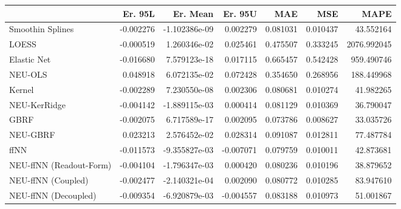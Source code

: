 \begin{tabular}{lrrrrrr}
\toprule
{} &   Er. 95L &      Er. Mean &   Er. 95U &       MAE &       MSE &         MAPE \\
\midrule
Smoothin Splines        & -0.002276 & -1.102386e-09 &  0.002279 &  0.081031 &  0.010437 &    43.552164 \\
LOESS                   & -0.000519 &  1.260346e-02 &  0.025461 &  0.475507 &  0.333245 &  2076.992045 \\
Elastic Net             & -0.016680 &  7.579123e-18 &  0.017115 &  0.665457 &  0.542428 &   959.490746 \\
NEU-OLS                 &  0.048918 &  6.072135e-02 &  0.072428 &  0.354650 &  0.268956 &   188.449968 \\
Kernel                  & -0.002289 &  7.230550e-08 &  0.002306 &  0.080681 &  0.010274 &    41.982265 \\
NEU-KerRidge            & -0.004142 & -1.889115e-03 &  0.000414 &  0.081129 &  0.010369 &    36.790047 \\
GBRF                    & -0.002075 &  6.717589e-17 &  0.002095 &  0.073786 &  0.008627 &    33.035726 \\
NEU-GBRF                &  0.023213 &  2.576452e-02 &  0.028314 &  0.091087 &  0.012811 &    77.487784 \\
ffNN                    & -0.011573 & -9.355827e-03 & -0.007071 &  0.079759 &  0.010011 &    42.873681 \\
NEU-ffNN (Readout-Form) & -0.004104 & -1.796347e-03 &  0.000420 &  0.080236 &  0.010196 &    38.879652 \\
NEU-ffNN (Coupled)      & -0.002477 & -2.140321e-04 &  0.002090 &  0.080772 &  0.010285 &    83.947610 \\
NEU-ffNN (Decoupled)    & -0.009354 & -6.920879e-03 & -0.004557 &  0.083188 &  0.010973 &    51.001867 \\
\bottomrule
\end{tabular}
